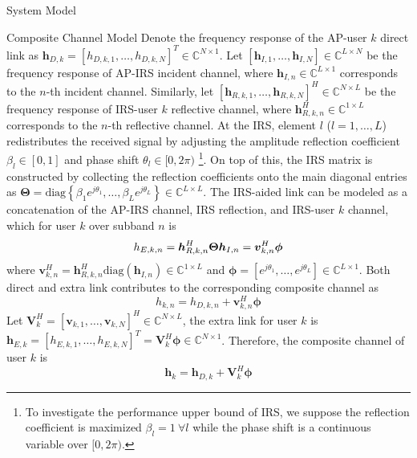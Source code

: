 \documentclass{IEEEtran}
\begin{document}
\begin{section}{System Model}
	\begin{subsection}{Composite Channel Model}
		Denote the frequency response of the AP-user $k$ direct link as $\boldsymbol{h}_{D,k}=[h_{D,k,1},\dots,h_{D,k,N}]^T \in \mathbb{C}^{N \times 1}$. Let $[\boldsymbol{h}_{I,1},\dots,\boldsymbol{h}_{I,N}] \in \mathbb{C}^{L \times N}$ be the frequency response of AP-IRS incident channel, where $\boldsymbol{h}_{I,n} \in \mathbb{C}^{L \times 1}$ corresponds to the $n$-th incident channel. Similarly, let $[\boldsymbol{h}_{R,k,1},\dots,\boldsymbol{h}_{R,k,N}]^H \in \mathbb{C}^{N \times L}$ be the frequency response of IRS-user $k$ reflective channel, where $\boldsymbol{h}_{R,k,n}^H \in \mathbb{C}^{1 \times L}$ corresponds to the $n$-th reflective channel. At the IRS, element $l$ ($l=1,\dots,L$) redistributes the received signal by adjusting the amplitude reflection coefficient $\beta_l \in [0,1]$ and phase shift $\theta_l \in [0,2\pi)$ \footnote{To investigate the performance upper bound of IRS, we suppose the reflection coefficient is maximized $\beta_l=1 \ \forall l$ while the phase shift is a continuous variable over $[0,2\pi)$.}. On top of this, the IRS matrix is constructed by collecting the reflection coefficients onto the main diagonal entries as $\boldsymbol{\Theta} = \mathrm{diag}\left\{\beta_1 e^{j \theta_1}, \dots, \beta_L e^{j \theta_L}\right\} \in \mathbb{C}^{L \times L}$. The IRS-aided link can be modeled as a concatenation of the AP-IRS channel, IRS reflection, and IRS-user $k$ channel, which for user $k$ over subband $n$ is
		\begin{equation}\label{eq:h_{E,k,n}}
			h_{E,k,n} = \boldsymbol{h}_{R,k,n}^H \boldsymbol{\Theta} \boldsymbol{h}_{I,n} = \boldsymbol{v}_{k,n}^H \boldsymbol{\phi}
		\end{equation}
		where $\boldsymbol{v}_{k,n}^H=\boldsymbol{h}_{R,k,n}^H \mathrm{diag}(\boldsymbol{h}_{I,n}) \in \mathbb{C}^{1 \times L}$ and $\boldsymbol{\phi}=[e^{j{\theta_1}},\dots,e^{j{\theta_L}}] \in \mathbb{C}^{L \times 1}$. Both direct and extra link contributes to the corresponding composite channel as
		\begin{equation}
			h_{k,n} = h_{D,k,n} + \boldsymbol{v}_{k,n}^H \boldsymbol{\phi}
		\end{equation}
		Let $\boldsymbol{V}_k^H=[\boldsymbol{v}_{k,1},\dots,\boldsymbol{v}_{k,N}]^H \in \mathbb{C}^{N \times L}$, the extra link for user $k$ is $\boldsymbol{h}_{E,k}=[h_{E,k,1},\dots,h_{E,k,N}]^T=\boldsymbol{V}_k^H \boldsymbol{\phi} \in \mathbb{C}^{N \times 1}$. Therefore, the composite channel of user $k$ is
		\begin{equation}\label{eq:h_k}
			\boldsymbol{h}_k = \boldsymbol{h}_{D,k} + \boldsymbol{V}_k^H \boldsymbol{\phi}
		\end{equation}
	\end{subsection}


\end{section}
\end{document}
